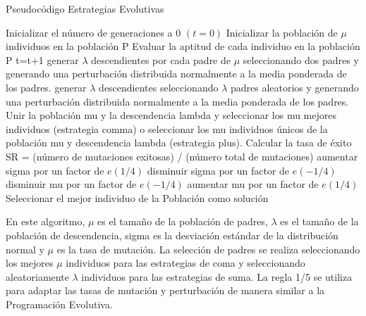 \documentclass{article}
\begin{document}
\begin{algorithm} \caption{Pseudocódigo Estrategias Evolutivas}
  \begin{algorithmic}[1]
    \State Inicializar el número de generaciones a 0 $(t=0)$
    \State Inicializar la población de $\mu$ individuos en la población P
    \State Evaluar la aptitud de cada individuo en la población P
    \Repeat
    \State t=t+1
    \State generar $\lambda$ descendientes por cada padre de $\mu$ seleccionando dos padres y generando una perturbación distribuida normalmente a la media ponderada de los padres.
    \EndIf
    \State generar $\lambda$ descendientes seleccionando $\lambda$ padres aleatorios y generando una perturbación distribuida normalmente a la media ponderada de los padres.
    \EndIf
    \State Unir la población mu y la descendencia lambda y seleccionar los mu mejores individuos (estrategia comma) o seleccionar los mu individuos únicos de la población mu y descendencia lambda (estrategia plus).
    \State Calcular la tasa de éxito SR = (número de mutaciones exitosas) / (número total de mutaciones)
    \State aumentar sigma por un factor de $e(1/4)$
    \Else
    \State disminuir sigma por un factor de $e(-1/4)$
    \EndIf
    \State disminuir mu por un factor de $e(-1/4)$
    \Else
    \State aumentar mu por un factor de $e(1/4)$
    \EndIf
    \State Seleccionar el mejor individuo de la Población como solución
  \end{algorithmic}
\end{algorithm}

En este algoritmo, $\mu$ es el tamaño de la población de padres, $\lambda$ es el tamaño de la población de descendencia, sigma es la desviación estándar de la distribución normal y $\mu$ es la tasa de mutación. La selección de padres se realiza seleccionando los mejores $\mu$ individuos para las estrategias de coma y seleccionando aleatoriamente $\lambda$ individuos para las estrategias de suma. La regla 1/5 se utiliza para adaptar las tasas de mutación y perturbación de manera similar a la Programación Evolutiva.
\end{document}
